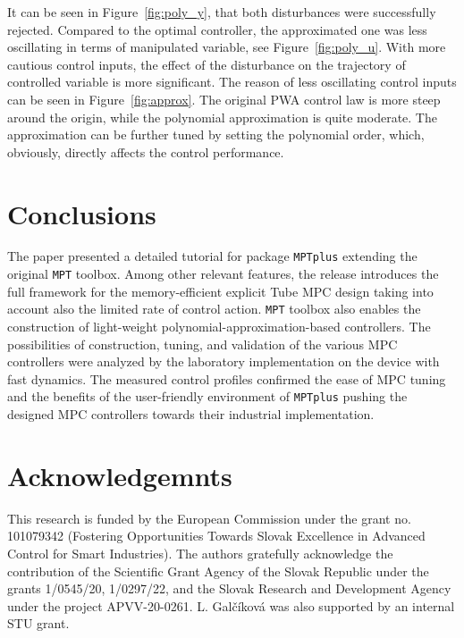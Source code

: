 \documentclass[letterpaper, 10 pt, conference]{ieeeconf}
\begin{document}
It can be seen in Figure~\ref{fig:poly_y}, that both disturbances were successfully rejected. Compared to the optimal controller, the approximated one was less oscillating in terms of manipulated variable, see Figure~\ref{fig:poly_u}. With more cautious control inputs, the effect of the disturbance on the trajectory of controlled variable is more significant. The reason of less oscillating control inputs can be seen in Figure~\ref{fig:approx}. The original PWA control law is more steep around the origin, while the polynomial approximation is quite moderate. The approximation can be further tuned by setting the polynomial order, which, obviously, directly affects the control performance.


\section{Conclusions}
\label{sec:conclusions}

The paper presented a detailed tutorial for package \texttt{MPTplus} extending the original \texttt{MPT} toolbox. Among other relevant features, the release introduces the full framework for the memory-efficient explicit Tube MPC design taking into account also the limited rate of control action. \texttt{MPT} toolbox also enables the construction of light-weight polynomial-approximation-based controllers. The possibilities of construction, tuning, and validation of the various MPC controllers were analyzed by the laboratory implementation on the device with fast dynamics. The measured control profiles confirmed the ease of MPC tuning and the benefits of the user-friendly environment of \texttt{MPTplus} pushing the designed MPC controllers towards their industrial implementation.

\addtolength{\textheight}{-12cm}

\section*{Acknowledgemnts}

\small{
This research is funded by the European Commission under the grant no. 101079342 (Fostering Opportunities Towards Slovak Excellence in Advanced Control for Smart Industries). The authors gratefully acknowledge the contribution of the Scientific Grant Agency of the Slovak Republic under the grants 1/0545/20, 1/0297/22, and the Slovak Research and Development Agency under the project APVV-20-0261. L. Galčíková was also supported by an internal STU grant. 
}



\end{document}
